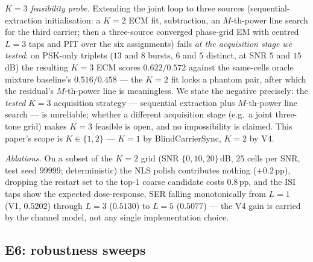 \documentclass[journal]{IEEEtran}
\begin{document}
\emph{$K{=}3$ feasibility probe.} Extending the joint loop to three
sources (sequential-extraction initialisation: a $K{=}2$ ECM fit,
subtraction, an $M$-th-power line search for the third carrier; then a
three-source converged phase-grid EM with centred $L{=}3$ taps and PIT
over the six assignments) fails \emph{at the acquisition stage we
tested}: on PSK-only triplets ($13$ and $8$ bursts, $6$ and $5$ distinct, at
SNR $5$ and
$15$\,dB) the resulting $K{=}3$ ECM scores $0.622/0.572$ against the
same-cells oracle mixture baseline's $0.516/0.458$ --- the $K{=}2$ fit
locks a phantom pair, after which the residual's $M$-th-power line is
meaningless. We
state the negative precisely: the \emph{tested} $K{=}3$ acquisition
strategy --- sequential extraction plus $M$-th-power line search --- is
unreliable; whether a different acquisition stage (e.g.\ a joint
three-tone grid) makes $K{=}3$ feasible is open, and no impossibility
is claimed. This paper's scope is
$K \in \{1,2\}$ --- $K{=}1$ by BlindCarrierSync, $K{=}2$ by V4.

\emph{Ablations.} On a subset of the $K{=}2$ grid (SNR
$\{0, 10, 20\}$\,dB, $25$ cells per SNR, test seed $99999$;
deterministic) the NLS polish contributes nothing
($+0.2$\,pp), dropping the restart set to the top-$1$ coarse candidate
costs $0.8$\,pp, and the ISI taps show the expected dose-response,
SER falling monotonically from $L{=}1$ (V1, $0.5202$) through
$L{=}3$ ($0.5130$) to $L{=}5$ ($0.5077$) --- the V4 gain
is carried by the channel model, not any single implementation choice.

\subsection{E6: robustness sweeps}
\label{sec:e6}
\end{document}
